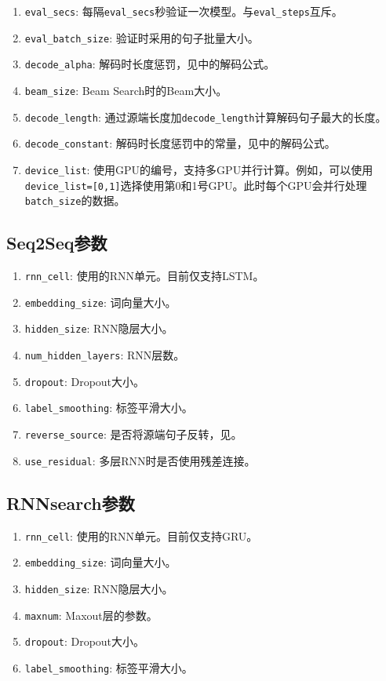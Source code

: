 \documentclass{article}
\begin{document}
\begin{enumerate}
\item \verb|eval_secs|: 每隔\verb|eval_secs|秒验证一次模型。与\verb|eval_steps|互斥。
\item \verb|eval_batch_size|: 验证时采用的句子批量大小。
\item \verb|decode_alpha|: 解码时长度惩罚，见\citep{Wu:16}中的解码公式。
\item \verb|beam_size|: Beam Search时的Beam大小。
\item \verb|decode_length|: 通过源端长度加\verb|decode_length|计算解码句子最大的长度。
\item \verb|decode_constant|: 解码时长度惩罚中的常量，见\citep{Wu:16}中的解码公式。
\item \verb|device_list|: 使用GPU的编号，支持多GPU并行计算。例如，可以使用\verb|device_list=[0,1]|选择使用第0和1号GPU。此时每个GPU会并行处理\verb|batch_size|的数据。
\end{enumerate}

\subsection{Seq2Seq参数}
\begin{enumerate}
\item \verb|rnn_cell|: 使用的RNN单元。目前仅支持LSTM。
\item \verb|embedding_size|: 词向量大小。
\item \verb|hidden_size|: RNN隐层大小。
\item \verb|num_hidden_layers|: RNN层数。
\item \verb|dropout|: Dropout大小。
\item \verb|label_smoothing|: 标签平滑大小。
\item \verb|reverse_source|: 是否将源端句子反转，见\citep{Sutskever:14}。
\item \verb|use_residual|: 多层RNN时是否使用残差连接。
\end{enumerate}
\subsection{RNNsearch参数}
\begin{enumerate}
\item \verb|rnn_cell|: 使用的RNN单元。目前仅支持GRU。
\item \verb|embedding_size|: 词向量大小。
\item \verb|hidden_size|: RNN隐层大小。
\item \verb|maxnum|: Maxout层的参数。
\item \verb|dropout|: Dropout大小。
\item \verb|label_smoothing|: 标签平滑大小。
\end{enumerate}
\end{document}
